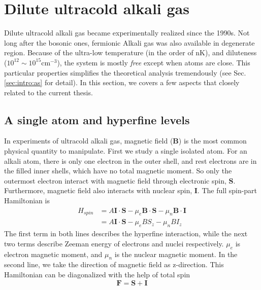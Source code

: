 \chapter{Dilute ultracold alkali gas}\label{sec:intro:one}
Dilute ultracold alkali gas became experimentally realized since the 1990s.  Not long after the bosonic ones, fermionic Alkali gas was also available in degenerate region.  Because of the ultra-low temperature (in the order of nK), and diluteness ($10^{12}\sim10^{15}\text{cm}^{-3}$), the system is mostly \emph{free} except when atoms are close.   This particular properties simplifies the theoretical analysis tremendously (see Sec. \ref{sec:intro:as} for detail).  In this section, we covers a few aspects that closely related to the current thesis.     

\section{A single atom and hyperfine levels}
In experiments of ultracold alkali gas, magnetic field ($\mathbf{B}$) is the most common physical quantity to manipulate.  First we study a  single isolated atom.  For an alkali atom, there is only one electron in the outer shell, and rest electrons are in the filled inner shells, which have no total magnetic moment.  So only the outermost electron interact with magnetic field through electronic spin, $\mathbf{S}$.  Furthermore, magnetic field also interacts with nuclear spin, $\mathbf{I}$.  The full spin-part Hamiltonian is
\begin{equation}
\begin{split}\label{eq:intro:1atom}
H_{spin}&=A \mathbf{I}\cdot\mathbf{S}-\mu_{e}\mathbf{B}\cdot\mathbf{S}-{\mu}_{n}\mathbf{B}\cdot\mathbf{I}\\
&=A \mathbf{I}\cdot\mathbf{S}-\mu_{e}{B}{S_{z}}-{\mu}_{n}{B}{I_{z}}
\end{split}
\end{equation}
The first term in both lines describes the hyperfine interaction, while the next two terms describe Zeeman energy of electrons and nuclei respectively. $\mu_{e}$ is electron magnetic moment, and $\mu_n$ is the nuclear magnetic moment.  In the second line, we take the direction of magnetic field as z-direction. This Hamiltonian can be diagonalized with the help of total spin 
\begin{equation}
\mathbf{F}=\mathbf{S}+\mathbf{I}
\end{equation}

